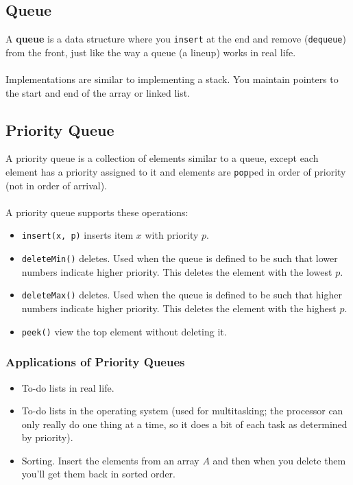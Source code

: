 \documentclass[]{article}
\theoremstyle{definition}
\newcommand{\lecture}[1]{\marginpar{{\footnotesize $\leftarrow$ \underline{#1}}}}
\begin{document}
		\subsection{Queue}
			A \textbf{queue} is a data structure where you \verb+insert+ at the end and remove (\verb+dequeue+) from the front, just like the way a queue (a lineup) works in real life.
			\\ \\
			Implementations are similar to implementing a stack. You maintain pointers to the start and end of the array or linked list.
		\subsection{Priority Queue} \lecture{January 22, 2013}
			A priority queue is a collection of elements similar to a queue, except each element has a priority assigned to it and elements are \verb+pop+ped in order of priority (not in order of arrival).
			\\ \\
			A priority queue supports these operations:
			\begin{itemize}
				\item \verb+insert(x, p)+ \textendash{} inserts item $x$ with priority $p$.
				\item \verb+deleteMin()+ \textendash{} deletes. Used when the queue is defined to be such that lower numbers indicate higher priority. This deletes the element with the lowest $p$.
				\item \verb+deleteMax()+ \textendash{} deletes. Used when the queue is defined to be such that higher numbers indicate higher priority. This deletes the element with the highest $p$.
				\item \verb+peek()+ \textendash{} view the top element without deleting it.
			\end{itemize}

			\subsubsection{Applications of Priority Queues}
				\begin{itemize}
					\item To-do lists in real life.
					\item To-do lists in the operating system (used for multitasking; the processor can only really do one thing at a time, so it does a bit of each task as determined by priority).
					\item Sorting. Insert the elements from an array $A$ and then when you delete them you'll get them back in sorted order.
				\end{itemize}
\end{document}
